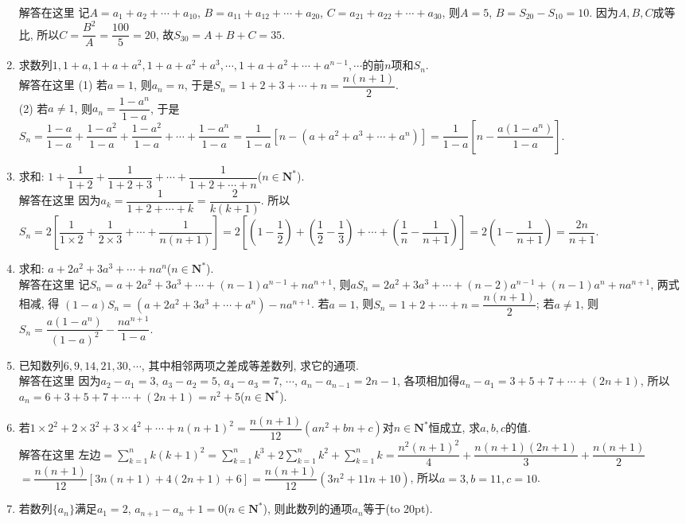 \documentclass[10pt,a4paper]{article}
\newcommand{\bracket}[1]{(\hbox to #1pt{})}
\begin{document}
\begin{enumerate}[1.]
解答在这里  记$A=a_1+a_2+\cdots +a_{10}$, $B=a_{11}+a_{12}+\cdots +a_{20}$, $C=a_{21}+a_{22}+\cdots +a_{30}$, 则$A=5$, $B=S_{20}-S_{10}=10$.
因为$A,B,C$成等比, 所以$C=\dfrac{B^2}A=\dfrac{100}5=20$, 故$S_{30}=A+B+C=35$.
\item 求数列$1,1+a,1+a+a^2,1+a+a^2+a^3,\cdots,1+a+a^2+\cdots +a^{n-1}, \cdots$的前$n$项和$S_n$.\\
解答在这里  (1) 若$a=1$, 则$a_n=n$, 于是$S_n=1+2+3+\cdots +n=\dfrac{n(n+1)}2$.\\
(2) 若$a\ne 1$, 则$a_n=\dfrac{1-{a^n}}{1-a}$, 于是
$S_n=\dfrac{1-a}{1-a}+\dfrac{1-{a^2}}{1-a}+\dfrac{1-{a^2}}{1-a}+\cdots +\dfrac{1-{a^n}}{1-a}=\dfrac 1{1-a}[n-(a+a^2+a^3+\cdots +a^n)]=\dfrac 1{1-a}[n-\dfrac{a(1-{a^n})}{1-a}]$.
\item 求和: $1+\dfrac 1{1+2}+\dfrac 1{1+2+3}+\cdots +\dfrac 1{1+2+\cdots +n}$($n\in \mathbf{N}^*$).\\
解答在这里  因为$a_k=\dfrac 1{1+2+\cdots +k}=\dfrac 2{k(k+1)}$.
所以$S_n=2[\dfrac 1{1\times 2}+\dfrac 1{2\times 3}+\cdots +\dfrac 1{n(n+1)}]=2[(1-\dfrac 12)+(\dfrac 12-\dfrac 13)+\cdots +(\dfrac 1n-\dfrac 1{n+1})]=2(1-\dfrac 1{n+1})=\dfrac{2n}{n+1}$.
\item 求和: $a+2a^2+3a^3+\cdots +na^n$($n\in \mathbf{N}^*$).\\
解答在这里  记$S_n=a+2a^2+3a^3+\cdots +(n-1)a^{n-1}+na^{n+1}$,
则$aS_n=2a^2+3a^3+\cdots +(n-2)a^{n-1}+(n-1)a^n+na^{n+1}$, 两式相减, 得
$(1-a)S_n=(a+2a^2+3a^3+\cdots +a^n)-na^{n+1}$.
若$a=1$, 则$S_n=1+2+\cdots +n=\dfrac{n(n+1)}2$; 若$a\ne 1$, 则$S_n=\dfrac{a(1-{a^n})}{{{(1-a)}^2}}-\dfrac{n{a^{n+1}}}{1-a}$.
\item 已知数列$6, 9, 14, 21, 30, \cdots$, 其中相邻两项之差成等差数列, 求它的通项.\\
解答在这里  因为$a_2-a_1=3$, $a_3-a_2=5$, $a_4-a_3=7$, $\cdots$, $a_n-a_{n-1}=2n-1$, 各项相加得$a_n-a_1=3+5+7+\cdots +(2n+1)$,
所以$a_n=6+3+5+7+\cdots +(2n+1)=n^2+5$($n\in \mathbf{N}^*$).
\item 若$1\times 2^2+2\times 3^2+3\times 4^2+\cdots +n(n+1)^2=\dfrac{n(n+1)}{12}(an^2+bn+c)$对$n\in \mathbf{N}^*$恒成立, 求$a,b,c$的值.\\
解答在这里  左边$=\sum\limits_{k=1}^nk(k+1)^2=\sum\limits_{k=1}^nk^3+2\sum\limits_{k=1}^nk^2+\sum\limits_{k=1}^nk=\dfrac{n^2(n+1)^2}4+\dfrac{n(n+1)(2n+1)}3+\dfrac{n(n+1)}2$
$=\dfrac{n(n+1)}{12}[3n(n+1)+4(2n+1)+6]=\dfrac{n(n+1)}{12}(3n^2+11n+10)$, 所以$a=3,b=11,c=10$.
\item 若数列$\{a_n\}$满足$a_1=2$, $a_{n+1}-a_n+1=0$($n\in \mathbf{N}^*$), 则此数列的通项$a_n$等于\bracket{20}.

\end{enumerate}
\end{document}
